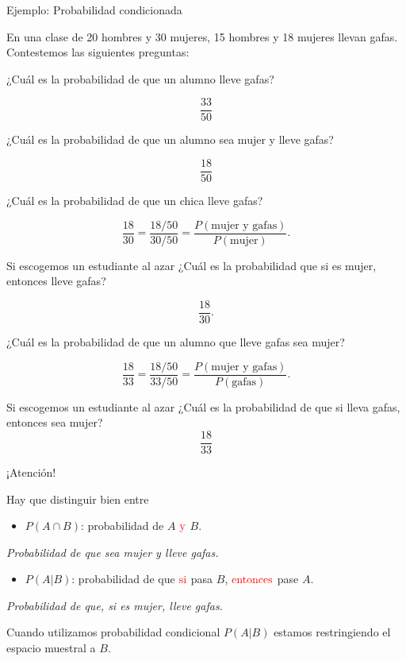 \documentclass[
  letterpaper,
  DIV=11,
  numbers=noendperiod]{scrreprt}
\providecommand{\tightlist}{%
  \setlength{\itemsep}{0pt}\setlength{\parskip}{0pt}}\usepackage{longtable,booktabs,array}
\begin{document}
\begin{Ejemplo}{Ejemplo: Probabilidad condicionada}{}

En una clase de 20 hombres y 30 mujeres, 15 hombres y 18 mujeres llevan
gafas. Contestemos las siguientes preguntas:

¿Cuál es la probabilidad de que un alumno lleve gafas?

\[
\frac{33}{50}
\]

¿Cuál es la probabilidad de que un alumno sea mujer y lleve gafas?

\[
\frac{18}{50}
\]

¿Cuál es la probabilidad de que un chica lleve gafas?

\[
\frac{18}{30}=\frac{18/50}{30/50}=\frac{P(\mbox{mujer  y gafas})}{P(\mbox{mujer})}.
\]

Si escogemos un estudiante al azar ¿Cuál es la probabilidad que si es
mujer, entonces lleve gafas?

\[
\frac{18}{30}.
\]

¿Cuál es la probabilidad de que un alumno que lleve gafas sea mujer?

\[
\frac{18}{33}=\frac{18/50}{33/50}=\frac{P(\mbox{mujer y gafas})}{P(\mbox{gafas})}.
\]

Si escogemos un estudiante al azar ¿Cuál es la probabilidad de que si
lleva gafas, entonces sea mujer? \[
    \frac{18}{33}
    \]

\end{Ejemplo}

\begin{Advertencia}{¡Atención!}{}

Hay que distinguir bien entre

\begin{itemize}
\tightlist
\item
  \(P(A\cap B)\): probabilidad de \(A\) \(\color{red}{\text{y}}\) \(B\).
\end{itemize}

\emph{Probabilidad de que sea mujer y lleve gafas.}

\begin{itemize}
\tightlist
\item
  \(P(A|B)\): probabilidad de que \(\color{red}{\text{si}}\) pasa \(B\),
  \(\color{red}{\text{entonces}}\) pase \(A\).
\end{itemize}

\emph{Probabilidad de que, si es mujer, lleve gafas.}

Cuando utilizamos probabilidad condicional \(P(A|B)\) estamos
restringiendo el espacio muestral a \(B\).

\end{Advertencia}
\end{document}
